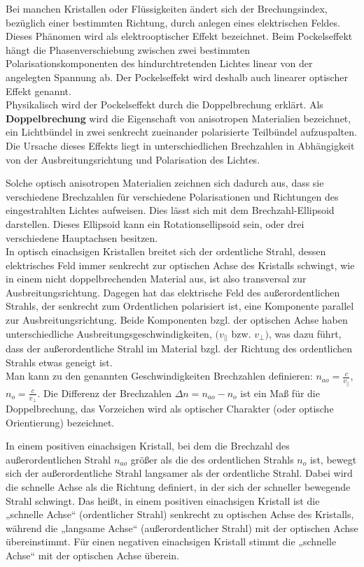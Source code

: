 \documentclass[12pt]{article}
\begin{document}
Bei manchen Kristallen oder Flüssigkeiten ändert sich der Brechungsindex, bezüglich einer bestimmten Richtung, durch anlegen eines elektrischen Feldes. Dieses Phänomen wird als elektrooptischer Effekt bezeichnet. Beim Pockelseffekt hängt die Phasenverschiebung zwischen zwei bestimmten Polarisationskomponenten des hindurchtretenden Lichtes linear von der angelegten Spannung ab. Der Pockelseffekt wird deshalb auch linearer optischer Effekt genannt.\\

Physikalisch wird der Pockelseffekt durch die Doppelbrechung erklärt.
Als \textbf{Doppelbrechung} wird die Eigenschaft von anisotropen Materialien bezeichnet, ein Lichtbündel in zwei senkrecht zueinander polarisierte Teilbündel aufzuspalten. Die Ursache dieses Effekts liegt in unterschiedlichen Brechzahlen in Abhängigkeit von der Ausbreitungsrichtung und Polarisation des Lichtes.

Solche optisch anisotropen Materialien zeichnen sich dadurch aus, dass sie verschiedene Brechzahlen für verschiedene Polarisationen und Richtungen des eingestrahlten Lichtes aufweisen. Dies lässt sich mit dem Brechzahl-Ellipsoid darstellen. Dieses Ellipsoid kann ein Rotationsellipsoid sein, oder drei verschiedene Hauptachsen besitzen. \\

In optisch einachsigen Kristallen breitet sich der ordentliche Strahl, dessen elektrisches Feld immer senkrecht zur optischen Achse des Kristalls schwingt, wie in einem nicht doppelbrechenden Material aus, ist also transversal zur Ausbreitungsrichtung. Dagegen hat das elektrische Feld des außerordentlichen Strahls, der senkrecht zum Ordentlichen polarisiert ist, eine Komponente parallel zur Ausbreitungsrichtung. Beide Komponenten bzgl. der optischen Achse haben unterschiedliche Ausbreitungsgeschwindigkeiten, $(v_{||}$ bzw. $v_{\bot})$, was dazu führt, dass der außerordentliche Strahl im Material bzgl. der Richtung des ordentlichen Strahls etwas geneigt ist.\\

Man kann zu den genannten Geschwindigkeiten Brechzahlen definieren: $n_{ao} = \frac{c}{v_{||}}$, $n_o = \frac{c}{v_{\bot}}$. Die Differenz der Brechzahlen $\Delta n = n_{ao} - n_o$ ist ein Maß für die Doppelbrechung, das Vorzeichen wird als optischer Charakter (oder optische Orientierung) bezeichnet.

In einem positiven einachsigen Kristall, bei dem die Brechzahl des außerordentlichen Strahl $n_{ao}$ größer als die des ordentlichen Strahls $n_o$ ist, bewegt sich der außerordentliche Strahl langsamer als der ordentliche Strahl. Dabei wird die schnelle Achse als die Richtung definiert, in der sich der schneller bewegende Strahl schwingt. Das heißt, in einem positiven einachsigen Kristall ist die „schnelle Achse“ (ordentlicher Strahl) senkrecht zu optischen Achse des Kristalls, während die „langsame Achse“ (außerordentlicher Strahl) mit der optischen Achse übereinstimmt. Für einen negativen einachsigen Kristall stimmt die „schnelle Achse“ mit der optischen Achse überein. \\
\end{document}
